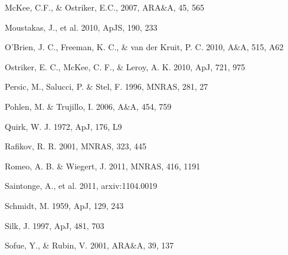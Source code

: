 \documentclass[12pt,preprint]{aastex}
\begin{document}
\begin{thebibliography}{}
 McKee, C.F., \& Ostriker, E.C., 2007, ARA\&A, 45, 565

 Moustakas, J., et al. 2010, ApJS, 190, 233







 O'Brien, J. C., Freeman, K. C., \& van der Kruit, P. C. 2010, A\&A, 515, A62

 Ostriker, E. C., McKee, C. F., \& Leroy, A. K. 2010, ApJ, 721, 975

 Persic, M., Salucci, P. \& Stel, F.  1996, MNRAS, 281, 27

 Pohlen, M. \& Trujillo, I. 2006, A\&A, 454, 759

 Quirk, W. J. 1972, ApJ, 176, L9


 Rafikov, R. R. 2001, MNRAS, 323, 445

 Romeo, A. B. \& Wiegert, J. 2011, MNRAS, 416, 1191





 Saintonge, A., et al. 2011, arxiv:1104.0019


 Schmidt, M. 1959, ApJ, 129, 243

 Silk, J. 1997, ApJ, 481, 703

 Sofue, Y., \& Rubin, V. 2001, ARA\&A, 39, 137


\end{thebibliography}
\end{document}
